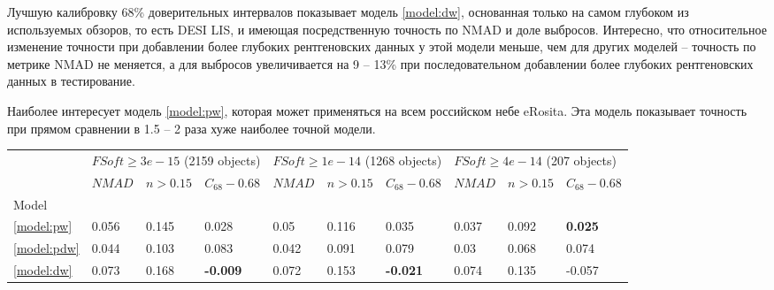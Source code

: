 \documentclass[fleqn,usenatbib]{mnras}
\begin{document}
Лучшую калибровку 68\% доверительных интервалов показывает модель \ref{model:dw}, основанная только на самом глубоком из используемых обзоров, то есть DESI LIS, и имеющая посредственную точность по NMAD и доле выбросов. Интересно, что относительное изменение точности при добавлении более глубоких рентгеновских данных у этой модели меньше, чем для других моделей -- точность по метрике NMAD не меняется, а для выбросов увеличивается на 9 -- 13\% при последовательном добавлении более глубоких рентгеновских данных в тестирование.

Наиболее интересует модель \ref{model:pw}, которая может применяться на всем российском небе eRosita. Эта модель показывает точность при прямом сравнении в 1.5 -- 2 раза хуже наиболее точной модели.

\begin{table}
	\begin{tabular}{llllllllll}
            \hline
            {} & \multicolumn{3}{l}{$FSoft \geq 3e-15$ (2159 objects)} & \multicolumn{3}{l}{$FSoft \geq 1e-14$ (1268 objects)} & \multicolumn{3}{l}{$FSoft \geq 4e-14$ (207 objects)} \\
            {} &                            $NMAD$ &        $n>0.15$ &  $C_{68} - 0.68$ &                            $NMAD$ &       $n>0.15$ &  $C_{68} - 0.68$ &                           $NMAD$ &        $n>0.15$ & $C_{68} - 0.68$ \\
            Model            &                                   &                 &                  &                                   &                &                  &                                  &                 &                 \\
            \hline
            \ref{model:pw}   &                             0.056 &           0.145 &            0.028 &                              0.05 &          0.116 &            0.035 &                            0.037 &           0.092 &  \textbf{0.025} \\
            \ref{model:pdw}  &                             0.044 &           0.103 &            0.083 &                             0.042 &          0.091 &            0.079 &                             0.03 &           0.068 &           0.074 \\
            \ref{model:dw}   &                             0.073 &           0.168 &  \textbf{-0.009} &                             0.072 &          0.153 &  \textbf{-0.021} &                            0.074 &           0.135 &          -0.057 \\

\end{tabular}
\end{table}
\end{document}
